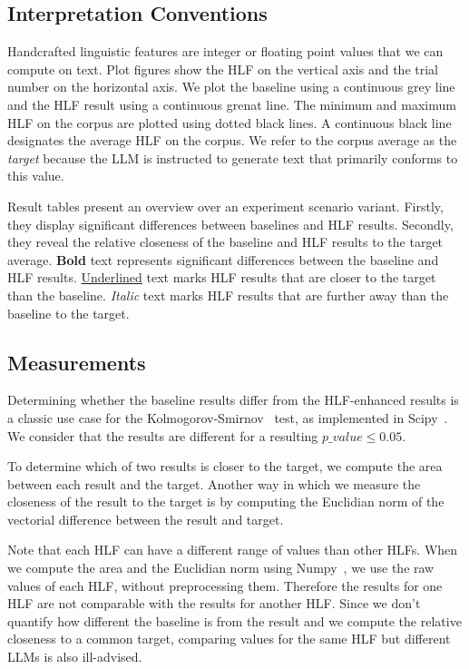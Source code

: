 \documentclass[11pt]{article}
\begin{document}
\subsection{Interpretation Conventions}

Handcrafted linguistic features are integer or floating point values that we
can compute on text.
Plot figures show the HLF on the vertical axis and the trial number on the horizontal
axis.
We plot the baseline using a continuous grey line and the HLF result using a
continuous grenat line.
The minimum and maximum HLF on the corpus are plotted using dotted black lines.
A continuous black line designates the average HLF on the corpus.
We refer to the corpus average as the \textit{target} because the LLM is
instructed to generate text that primarily conforms to this value.

Result tables present an overview over an experiment scenario variant.
Firstly, they display significant differences between baselines and HLF results.
Secondly, they reveal the relative closeness of the baseline and HLF results to
the target average.
\textbf{Bold} text represents significant differences between the baseline and
HLF results.
\underline{Underlined} text marks HLF results that are closer to the target than
the baseline.
\textit{Italic} text marks HLF results that are further away than the baseline
to the target.

\subsection{Measurements}\label{subsec:measurements}

Determining whether the baseline results differ from the HLF-enhanced results is
a classic use case for the Kolmogorov-Smirnov~\cite{kolmogorov1933,smirnov1939}
test, as implemented in Scipy~\cite{2020SciPy-NMeth}.
We consider that the results are different for a resulting $p\_value \le 0.05$.

To determine which of two results is closer to the target, we compute the area
between each result and the target.
Another way in which we measure the closeness of the result to the target is by
computing the Euclidian norm of the vectorial difference between the result and
target.

Note that each HLF can have a different range of values than other HLFs.
When we compute the area and the Euclidian norm using Numpy~\cite{harris2020array},
we use the raw values of each HLF, without preprocessing them.
Therefore the results for one HLF are not comparable with the results for
another HLF.\@
Since we don't quantify how different the baseline is from the result and we
compute the relative closeness to a common target, comparing values for the same
HLF but different LLMs is also ill-advised.
\end{document}
